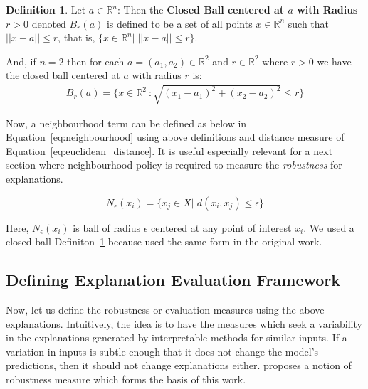 \documentclass[english]{tktltiki2}
\theoremstyle{definition}
\newtheorem{definition}[thm]{Definition}
\theoremstyle{remark}
\newcommand{\onespace}{\;}
\begin{document}
\begin{definition}\label{def:2}{Let $a \in {\mathbb{R}}^n$: Then the \textbf{Closed Ball centered at $a$ with Radius $r > 0$} denoted $B_{r}(a)$ is defined to be a set of all points $x \in {\mathbb{R}}^n$ such that $||x-a|| \leq r$, that is, $\{x \in {\mathbb{R}}^n |\;||x - a|| \leq r\}.$}
\end{definition}
And, if $n=2$ then for each $a = (a_1,a_2) \in {\mathbb{R}}^2$ and $r \in {\mathbb{R}}^2$ where $r > 0$ we have the closed ball centered at $a$ with radius $r$ is:
\begin{align*}
B_{r}(a) = \{x \in {\mathbb{R}}^2\ : \sqrt{(x_1 - a_1)^2 + (x_2 - a_2)^2} \leq r\}
\end{align*}

Now, a neighbourhood term can be defined as below in Equation~\eqref{eq:neighbourhood} using above definitions and distance measure of Equation~\eqref{eq:euclidean_distance}. It is useful especially relevant for a next section where neighbourhood policy is required to measure the \textit{robustness} for explanations. 

\begin{equation}\label{eq:neighbourhood}
N_{\epsilon}(x_i) = \{x_j \in X| \onespace d(x_i, x_j) \leq \epsilon\}
\end{equation}  

Here, $N_{\epsilon}(x_{i})$ is ball of radius $\epsilon$ centered at any point of interest $x_i$. We used a closed ball Definiton~\ref{def:2} because \citet{alvarez2018robustness} used the same form in the original work.

\subsection{Defining Explanation Evaluation Framework}\label{sec:defining_explanation_evaluation_framework} %

Now, let us define the robustness or evaluation measures using the above explanations. Intuitively, the idea is to have the measures which seek a variability in the explanations generated by interpretable methods for similar inputs. If a variation in inputs is subtle enough that it does not change the model's predictions, then it should not change explanations either. \citet{alvarez2018robustness} proposes a notion of robustness measure which forms the basis of this work.
\end{document}
